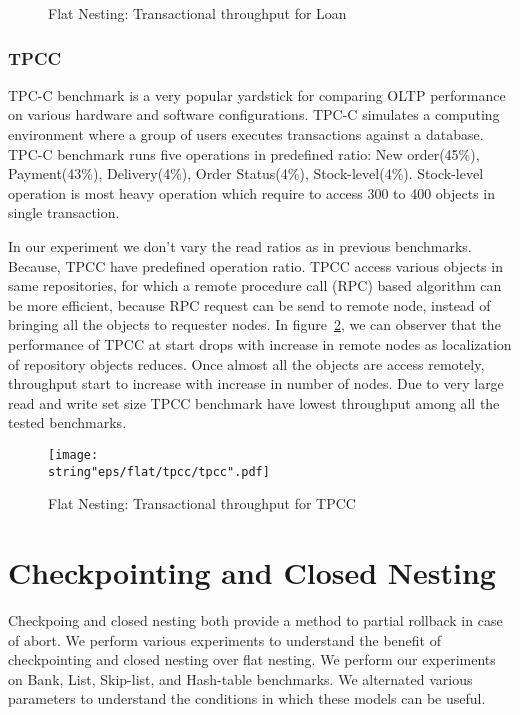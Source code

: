 \documentclass[12pt,english]{report}
\begin{document}
\begin{figure}[H]
\centering
{}
\caption{Flat Nesting: Transactional throughput for Loan}
\label{Fig:flatLoan}
\end{figure}

\subsubsection{TPCC}

TPC-C benchmark is a very popular yardstick for comparing OLTP performance on various hardware and software configurations. TPC-C simulates a computing environment where a group of users executes transactions against a database. TPC-C benchmark runs five operations in predefined ratio: New order(45\%), Payment(43\%), Delivery(4\%), Order Status(4\%), Stock-level(4\%). Stock-level operation is most heavy operation which require to access 300 to 400 objects in single transaction. 

In our experiment we don't vary the read ratios as in previous benchmarks. Because, TPCC have predefined operation ratio. TPCC access various objects in same repositories, for which a remote procedure call (RPC) based algorithm can be more efficient, because RPC request can be send to remote node, instead of bringing all the objects to requester nodes. In figure~\ref{Fig:flatTPCC}, we can observer that the performance of TPCC at start drops with increase in remote nodes as localization of repository objects reduces. Once almost all the objects are access remotely, throughput start to increase with increase in number of nodes. Due to very large read and write set size TPCC benchmark have lowest throughput among all the tested benchmarks.

\begin{figure}[H]
\centering
\texttt{[image: \\string"eps/flat/tpcc/tpcc".pdf]}
\caption{Flat Nesting: Transactional throughput for TPCC}
\label{Fig:flatTPCC}
\end{figure}

\section{Checkpointing and Closed Nesting}

Checkpoing and closed nesting both provide a method to partial rollback in case of abort. We perform various experiments to understand the benefit of checkpointing and closed nesting over flat nesting. We perform our experiments on Bank, List, Skip-list, and Hash-table benchmarks. We alternated various parameters to understand the conditions in which these models can be useful.
\end{document}

